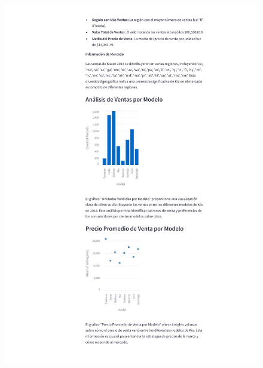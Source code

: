 \begin{anexos}
\begin{figure}
		\includegraphics[height=\textheight]{reporte/3.png}
	\end{figure} 
	\begin{figure}
		\centering

\end{figure}
\end{anexos}
